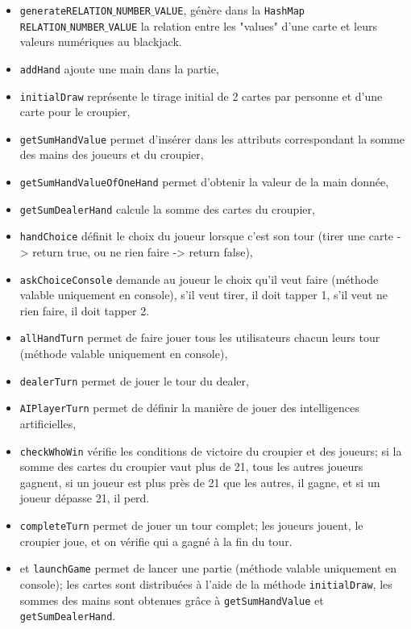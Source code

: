 \documentclass[french,12pt]{article}
\begin{document}
\begin{itemize}
	\item \texttt{generateRELATION$\_$NUMBER$\_$VALUE}, génère dans la
		  \texttt{HashMap \\ RELATION$\_$NUMBER$\_$VALUE} la relation entre
		  les "values" d'une carte et leurs valeurs numériques au
		  blackjack.
	\item \texttt{addHand} ajoute une main dans la partie,
	\item \texttt{initialDraw} représente le tirage initial de 2 cartes par
		  personne et d'une carte pour le croupier,
	\item \texttt{getSumHandValue} permet d'insérer dans les attributs
		  correspondant la somme des mains des joueurs et du croupier,
	\item \texttt{getSumHandValueOfOneHand} permet d'obtenir la valeur de
		  la main donnée,
	\item \texttt{getSumDealerHand} calcule la somme des cartes du
		  croupier,
	\item \texttt{handChoice} définit le choix du joueur lorsque c'est son
		  tour (tirer une carte -> return true, ou ne rien faire -> return
		  false),
	\item \texttt{askChoiceConsole} demande au joueur le choix qu'il veut
		  faire (méthode valable uniquement en console), s'il veut tirer,
		  il doit tapper 1, s'il veut ne rien faire, il doit tapper 2.
	\item \texttt{allHandTurn} permet de faire jouer tous les utilisateurs
		  chacun leurs tour (méthode valable uniquement en console),
	\item \texttt{dealerTurn} permet de jouer le tour du dealer,
	\item \texttt{AIPlayerTurn} permet de définir la manière de jouer des
		  intelligences artificielles,
	\item \texttt{checkWhoWin} vérifie les conditions de victoire du
		  croupier et des joueurs; si la somme des cartes du croupier vaut
		  plus de 21, tous les autres joueurs gagnent, si un joueur est
		  plus près de 21 que les autres, il gagne, et si un joueur dépasse
		  21, il perd.
	\item \texttt{completeTurn} permet de jouer un tour complet; les
		  joueurs jouent, le croupier joue, et on vérifie qui a gagné à la
		  fin du tour.
	\item et \texttt{launchGame} permet de lancer une partie (méthode
		  valable uniquement en console); les cartes sont distribuées à
		  l'aide de la méthode \texttt{initialDraw}, les sommes des mains
		  sont obtenues grâce à \texttt{getSumHandValue} et
		  \texttt{getSumDealerHand}.\\
\end{itemize}
\end{document}
